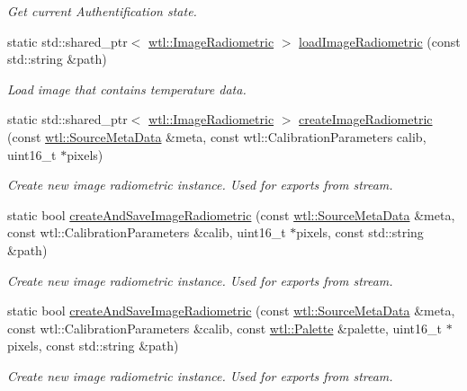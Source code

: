 \begin{DoxyCompactItemize}
\begin{DoxyCompactList}\small\item\em Get current Authentification state. \end{DoxyCompactList}\item 
static std\+::shared\+\_\+ptr$<$ \hyperlink{classwtl_1_1_image_radiometric}{wtl\+::\+Image\+Radiometric} $>$ \hyperlink{classwtl_1_1_center_a977533acfaafc905d9751b31ed3293e5}{load\+Image\+Radiometric} (const std\+::string \&path)
\begin{DoxyCompactList}\small\item\em Load image that contains temperature data. \end{DoxyCompactList}\item 
static std\+::shared\+\_\+ptr$<$ \hyperlink{classwtl_1_1_image_radiometric}{wtl\+::\+Image\+Radiometric} $>$ \hyperlink{classwtl_1_1_center_a01de33d0501f20007e72508ba203c2a9}{create\+Image\+Radiometric} (const \hyperlink{classwtl_1_1_source_meta_data}{wtl\+::\+Source\+Meta\+Data} \&meta, const wtl\+::\+Calibration\+Parameters calib, uint16\+\_\+t $\ast$pixels)
\begin{DoxyCompactList}\small\item\em Create new image radiometric instance. Used for exports from stream. \end{DoxyCompactList}\item 
static bool \hyperlink{classwtl_1_1_center_a07b066ca7a5598022da203897f43d70f}{create\+And\+Save\+Image\+Radiometric} (const \hyperlink{classwtl_1_1_source_meta_data}{wtl\+::\+Source\+Meta\+Data} \&meta, const wtl\+::\+Calibration\+Parameters \&calib, uint16\+\_\+t $\ast$pixels, const std\+::string \&path)
\begin{DoxyCompactList}\small\item\em Create new image radiometric instance. Used for exports from stream. \end{DoxyCompactList}\item 
static bool \hyperlink{classwtl_1_1_center_a2d44c8aff8c33fb0dc6bc60e0d34210a}{create\+And\+Save\+Image\+Radiometric} (const \hyperlink{classwtl_1_1_source_meta_data}{wtl\+::\+Source\+Meta\+Data} \&meta, const wtl\+::\+Calibration\+Parameters \&calib, const \hyperlink{classwtl_1_1_palette}{wtl\+::\+Palette} \&palette, uint16\+\_\+t $\ast$pixels, const std\+::string \&path)
\begin{DoxyCompactList}\small\item\em Create new image radiometric instance. Used for exports from stream. \end{DoxyCompactList}\item 

\end{DoxyCompactItemize}
